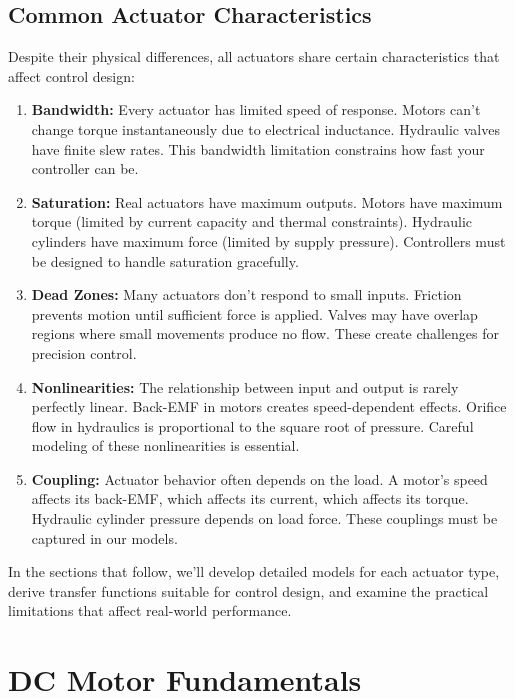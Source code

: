 \subsection{Common Actuator Characteristics}

Despite their physical differences, all actuators share certain characteristics that affect control design:

\begin{enumerate}
    \item \textbf{Bandwidth:} Every actuator has limited speed of response. Motors can't change torque instantaneously due to electrical inductance. Hydraulic valves have finite slew rates. This bandwidth limitation constrains how fast your controller can be.

    \item \textbf{Saturation:} Real actuators have maximum outputs. Motors have maximum torque (limited by current capacity and thermal constraints). Hydraulic cylinders have maximum force (limited by supply pressure). Controllers must be designed to handle saturation gracefully.

    \item \textbf{Dead Zones:} Many actuators don't respond to small inputs. Friction prevents motion until sufficient force is applied. Valves may have overlap regions where small movements produce no flow. These create challenges for precision control.

    \item \textbf{Nonlinearities:} The relationship between input and output is rarely perfectly linear. Back-EMF in motors creates speed-dependent effects. Orifice flow in hydraulics is proportional to the square root of pressure. Careful modeling of these nonlinearities is essential.

    \item \textbf{Coupling:} Actuator behavior often depends on the load. A motor's speed affects its back-EMF, which affects its current, which affects its torque. Hydraulic cylinder pressure depends on load force. These couplings must be captured in our models.
\end{enumerate}

In the sections that follow, we'll develop detailed models for each actuator type, derive transfer functions suitable for control design, and examine the practical limitations that affect real-world performance.

\section{DC Motor Fundamentals}
\label{sec:dc_motor_fundamentals}


